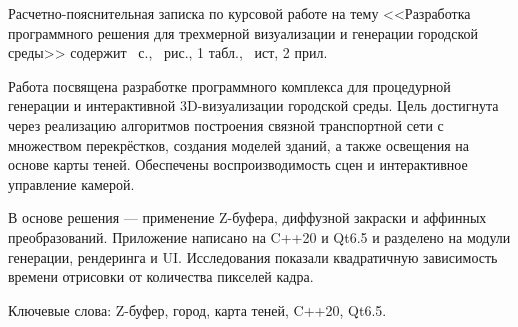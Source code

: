 
Расчетно-пояснительная записка по курсовой работе на тему <<Разработка программного решения для трехмерной визуализации и генерации городской среды>> содержит~\pageref{LastPage} с., \totalfigures\ рис., 1 табл., \totalenumivs\ ист, 2 прил. 

Работа посвящена разработке программного комплекса для процедурной генерации и интерактивной 3D-визуализации городской среды. Цель достигнута через реализацию алгоритмов построения связной транспортной сети с множеством перекрёстков, создания моделей зданий, а также освещения на основе карты теней. Обеспечены воспроизводимость сцен и интерактивное управление камерой.  

В основе решения --- применение Z-буфера, диффузной закраски и аффинных преобразований. Приложение написано на C++20 и Qt6.5 и разделено на модули генерации, рендеринга и UI. Исследования показали квадратичную зависимость времени отрисовки от количества пикселей кадра.  

Ключевые слова: Z-буфер, город, карта теней, C++20, Qt6.5.